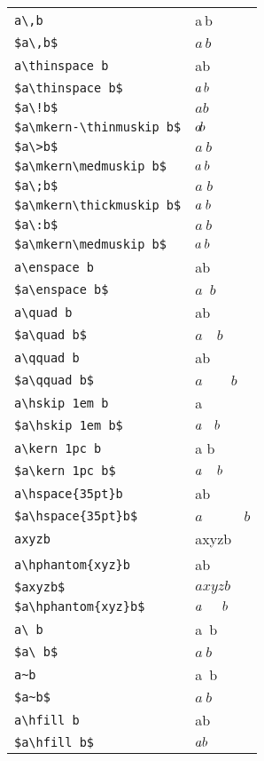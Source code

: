 \documentclass[11pt,4apaper]{article}
\begin{document}
\noindent\begin{tabularx}{\textwidth}{| l | X |}
	\hline
	\verb|a\,b| & a\,b \\
	\verb|$a\,b$| & $a\,b$ \\
	\verb|a\thinspace b| & a\thinspace b \\
	\verb|$a\thinspace b$| & $a\thinspace b$ \\
	\verb|$a\!b$| & $a\!b$ \\
	\verb|$a\mkern-\thinmuskip b$| & $a\mkern-\thinmuskip b$ \\
	\verb|$a\>b$| & $a\>b$ \\
	\verb|$a\mkern\medmuskip b$| & $a\mkern\medmuskip b$ \\
	\verb|$a\;b$| & $a\;b$ \\
	\verb|$a\mkern\thickmuskip b$| & $a\mkern\thickmuskip b$ \\
	\verb|$a\:b$| & $a\:b$ \\
	\verb|$a\mkern\medmuskip b$| & $a\mkern\medmuskip b$ \\
	\verb|a\enspace b| & a\enspace b \\
	\verb|$a\enspace b$| & $a\enspace b$ \\
	\verb|a\quad b| & a\quad b \\
	\verb|$a\quad b$| & $a\quad b$ \\
	\verb|a\qquad b| & a\qquad b \\
	\verb|$a\qquad b$| & $a\qquad b$ \\
	\verb|a\hskip 1em b| & a\hskip 1em b \\
	\verb|$a\hskip 1em b$| & $a\hskip 1em b$ \\
	\verb|a\kern 1pc b| & a\kern 1pc b \\
	\verb|$a\kern 1pc b$| & $a\kern 1pc b$ \\
	\verb|a\hspace{35pt}b| & a\hspace{35pt}b \\
	\verb|$a\hspace{35pt}b$| & $a\hspace{35pt}b$ \\
	\verb|axyzb| & axyzb \\
	\verb|a\hphantom{xyz}b| & a\hphantom{xyz}b \\
	\verb|$axyzb$| & $axyzb$ \\
	\verb|$a\hphantom{xyz}b$| & $a\hphantom{xyz}b$ \\
	\verb|a\ b| & a\ b \\
	\verb|$a\ b$| & $a\ b$ \\
	\verb|a~b| & a~b \\
	\verb|$a~b$| & $a~b$ \\
	\verb|a\hfill b| & a\hfill b \\
	\verb|$a\hfill b$| & $a\hfill b$\\
	\hline
\end{tabularx}
\end{document}
